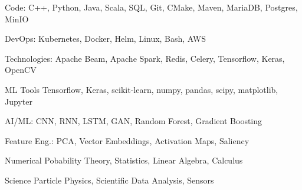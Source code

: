 

\begin{cvskills}

\cvskill
    {Code:} %
    {C++, Python, Java, Scala, SQL, Git, CMake, Maven,  
    MariaDB, Postgres, MinIO} %


\cvskill
    {DevOps:} %
    {Kubernetes, Docker, Helm, Linux, Bash, AWS} %

\cvskill
    {Technologies:} %
    {Apache Beam, Apache Spark, Redis, Celery, Tensorflow, Keras, OpenCV} %

\cvskill
    {ML Tools} %
    {Tensorflow, Keras, scikit-learn, numpy, pandas, scipy, matplotlib, Jupyter} %

\cvskill
    {AI/ML:} %
    {CNN, RNN, LSTM, GAN, Random Forest, Gradient Boosting} %

\cvskill
    {Feature Eng.:} %
    {PCA, Vector Embeddings, Activation Maps, Saliency} %


\cvskill

\cvskill
    {Numerical} %
    {Pobability Theory, Statistics, Linear Algebra, Calculus} %

\cvskill
    {Science} %
    {Particle Physics, Scientific Data Analysis, Sensors} %




\end{cvskills}
